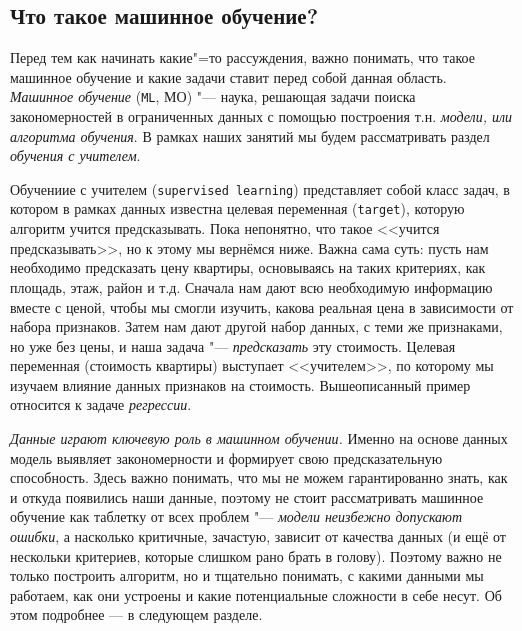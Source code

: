 \subsection*{Что такое машинное обучение?}
Перед тем как начинать какие"=то рассуждения, важно понимать, что такое машинное обучение и какие задачи ставит перед собой данная область.
\textit{Машинное обучение} (\texttt{ML}, МО) "--- наука, решающая задачи поиска закономерностей в ограниченных данных с помощью построения т.н. \textit{модели, или алгоритма обучения}. В рамках наших занятий мы будем рассматривать раздел \textit{обучения с учителем}.

Обучениие с учителем (\texttt{supervised learning}) представляет собой класс задач, в котором в рамках данных известна целевая переменная (\texttt{target}), которую алгоритм учится предсказывать. Пока непонятно, что такое <<учится предсказывать>>, но к этому мы вернёмся ниже. Важна сама суть: пусть нам необходимо предсказать цену квартиры, основываясь на таких критериях, как площадь, этаж, район и т.д. Сначала нам дают всю необходимую информацию вместе с ценой, чтобы мы смогли изучить, какова реальная цена в зависимости от набора признаков. Затем нам дают другой набор данных, с теми же признаками, но уже без цены, и наша задача "--- \textit{предсказать} эту стоимость. Целевая переменная (стоимость квартиры) выступает <<учителем>>, по которому мы изучаем влияние данных признаков на стоимость. Вышеописанный пример относится к задаче \textit{регрессии}.

\textit{Данные играют ключевую роль в машинном обучении.} Именно на основе данных модель выявляет закономерности и формирует свою предсказательную способность. Здесь важно понимать, что мы не можем гарантированно знать, как и откуда появились наши данные, поэтому не стоит рассматривать машинное обучение как таблетку от всех проблем "--- \textit{модели неизбежно допускают ошибки}, а насколько критичные, зачастую, зависит от качества данных (и ещё от нескольки критериев, которые слишком рано брать в голову). Поэтому важно не только построить алгоритм, но и тщательно понимать, с какими данными мы работаем, как они устроены и какие потенциальные сложности в себе несут. Об этом подробнее — в следующем разделе.